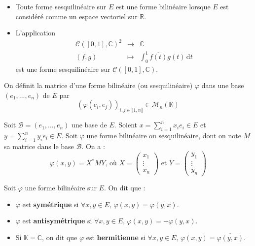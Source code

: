  \begin{example}
    \begin{itemize}
      \item Toute forme sesquilinéaire sur $E$ est une forme bilinéaire lorsque $E$ est considéré comme un espace vectoriel sur $\mathbb{R}$.
      \item L'application
      \[
        \begin{array}{ccc}
          \mathcal{C}([0,1], \mathbb{C})^2 &\rightarrow& \mathbb{C} \\
          (f,g) &\mapsto& \int_0^1 \overline{f(t)} g(t) \, \mathrm{d}t
        \end{array}
      \]
      est une forme sesquilinéaire sur $\mathcal{C}([0,1], \mathbb{C})$.
    \end{itemize}
  \end{example}

  \begin{definition}
    On définit la matrice d'une forme bilinéaire (ou sesquilinéaire) $\varphi$ dans une base $(e_1, \dots, e_n)$ de $E$ par
    \[ (\varphi(e_i, e_j))_{i, j \in \llbracket 1, n \rrbracket} \in \mathcal{M}_n(\mathbb{K}) \]
  \end{definition}

  \begin{remark}
    Soit $\mathcal{B} = (e_1, \dots, e_n)$ une base de $E$. Soient $x = \sum_{i=1}^{n} x_i e_i \in E$ et $y = \sum_{i=1}^{n} y_i e_i \in E$. Soit $\varphi$ une forme bilinéaire ou sesquilinéaire, dont on note $M$ sa matrice dans le base $\mathcal{B}$. On a :
    \[ \varphi(x,y) = X^* M Y \text{, où } X = \begin{pmatrix} x_1 \\ \vdots \\ x_n \end{pmatrix} \text{ et } Y = \begin{pmatrix} y_1 \\ \vdots \\ y_n \end{pmatrix} \]
  \end{remark}

  \begin{definition}
    Soit $\varphi$ une forme bilinéaire sur $E$. On dit que :
    \begin{itemize}
      \item $\varphi$ est \textbf{symétrique} si $\forall x, y \in E, \, \varphi(x,y) = \varphi(y,x)$.
      \item $\varphi$ est \textbf{antisymétrique} si $\forall x, y \in E, \, \varphi(x,y) = -\varphi(y,x)$.
      \item Si $\mathbb{K} = \mathbb{C}$, on dit que $\varphi$ est \textbf{hermitienne} si $\forall x, y \in E, \, \varphi(x,y) = \overline{\varphi(y,x)}$.
    \end{itemize}
  \end{definition}

